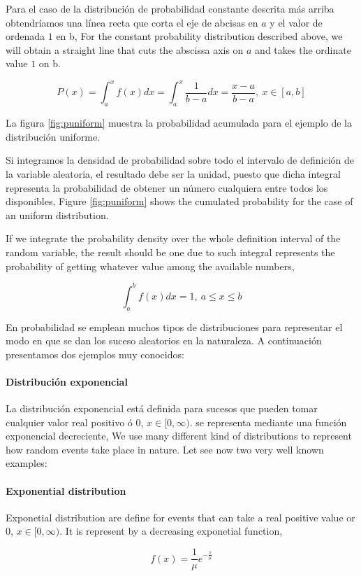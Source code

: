 \begin{paracol}{2}
Para el caso de la distribución de probabilidad constante descrita más arriba obtendríamos una línea recta que corta el eje de abcisas en $a$ y el valor de ordenada $1$ en b,
\switchcolumn
For the constant probability distribution described above, we will obtain a straight line that cuts the abscissa axis on $a$ and takes the ordinate value $1$ on b.
\end{paracol} 
\begin{equation*}
P(x) = \int_a^xf(x)dx = \int_a^x \frac{1}{b-a}dx = \frac{x-a}{b-a}, \ x \in[a,b]
\end{equation*}
\begin{paracol}{2}
La figura \ref{fig:puniform} muestra la probabilidad acumulada para el ejemplo de la distribución uniforme. 

Si integramos la densidad de probabilidad sobre todo el intervalo de definición de la variable aleatoria, el resultado debe ser la unidad, puesto que dicha integral representa la probabilidad de obtener un número cualquiera entre todos los disponibles,
\switchcolumn
Figure \ref{fig:puniform} shows the cumulated probability for the case of an uniform distribution.

If we integrate the probability density over the whole definition interval of the random variable, the result should be one due to such integral represents the probability of getting whatever value among the available numbers, 
\end{paracol}
\begin{equation*}
\int_a^b f(x)dx =1, \ a\leqslant x \leqslant b
\end{equation*}
\begin{paracol}{2}
En probabilidad se emplean muchos tipos de distribuciones para representar el modo en que se dan los suceso aleatorios en la naturaleza. A continuación presentamos dos ejemplos muy conocidos:

\paragraph{Distribución exponencial} 
La distribución exponencial está definida para sucesos que pueden tomar cualquier valor real positivo ó 0, $x \in [0,\infty)$. se representa mediante una función exponencial decreciente,
\switchcolumn
We use many different kind of distributions to represent how random events take place in nature. Let see now two very well known examples: 

\paragraph{Exponential distribution} 
Exponetial distribution are define for events that can take a real positive value or $0$, $x\in [0,\infty)$. It is represent by a decreasing exponetial function,
\end{paracol}
\begin{equation*}
f(x)=\frac{1}{\mu}e^{-\frac{x}{\mu}}
\end{equation*}

